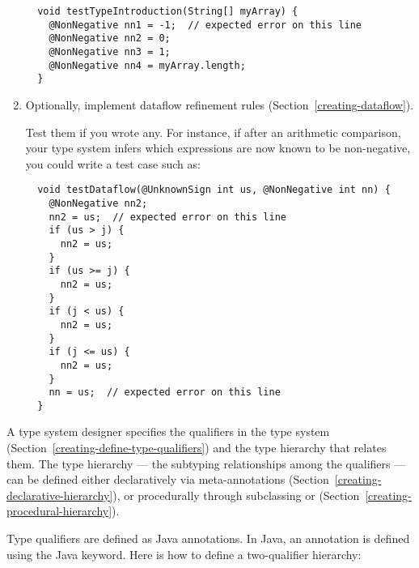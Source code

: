 \begin{enumerate}
\begin{Verbatim}
  void testTypeIntroduction(String[] myArray) {
    @NonNegative nn1 = -1;  // expected error on this line
    @NonNegative nn2 = 0;
    @NonNegative nn3 = 1;
    @NonNegative nn4 = myArray.length;
  }
\end{Verbatim}

\item
  Optionally, implement dataflow refinement rules
  (Section~\ref{creating-dataflow}).

  Test them if you wrote any.
  For instance, if after an arithmetic comparison, your type system infers
  which expressions are now known to be non-negative, you could write a
  test case such as:

\begin{Verbatim}
  void testDataflow(@UnknownSign int us, @NonNegative int nn) {
    @NonNegative nn2;
    nn2 = us;  // expected error on this line
    if (us > j) {
      nn2 = us;
    }
    if (us >= j) {
      nn2 = us;
    }
    if (j < us) {
      nn2 = us;
    }
    if (j <= us) {
      nn2 = us;
    }
    nn = us;  // expected error on this line
  }
\end{Verbatim}

\end{enumerate}





A type system designer specifies the qualifiers in the type system (Section~\ref{creating-define-type-qualifiers})
and
the type hierarchy that relates them.
The type hierarchy --- the subtyping relationships among the qualifiers ---
can be defined either
declaratively via meta-annotations (Section~\ref{creating-declarative-hierarchy}), or procedurally through
subclassing  or
 (Section~\ref{creating-procedural-hierarchy}).




Type qualifiers are defined as Java annotations.  In Java, an
annotation is defined using the Java  keyword.
Here is how to define a two-qualifier hierarchy:

